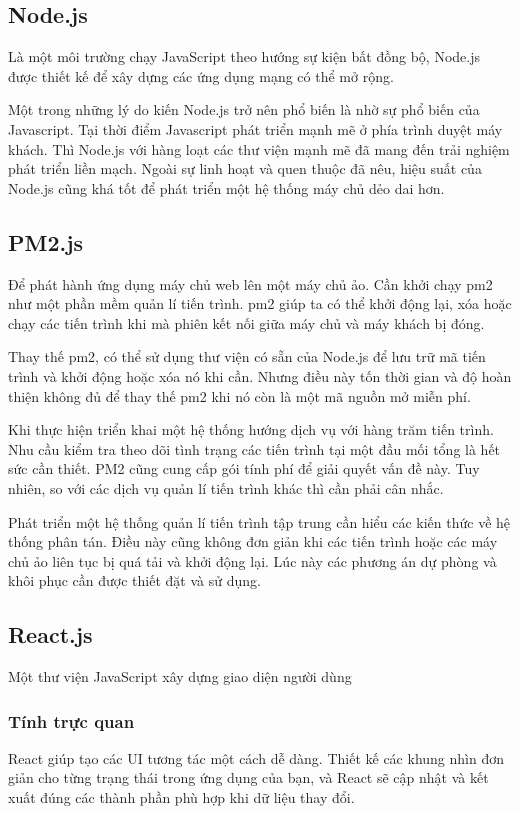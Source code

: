 {{\subsection{Node.js}
Là một môi trường chạy JavaScript theo hướng sự kiện bất đồng bộ, Node.js được thiết kế để xây dựng các ứng dụng mạng có thể mở rộng.

Một trong những lý do kiến Node.js trở nên phổ biến là nhờ sự phổ biến của Javascript. Tại thời điểm Javascript phát triển mạnh mẽ ở phía trình duyệt máy khách. Thì Node.js với hàng loạt các thư viện mạnh mẽ đã mang đến trải nghiệm phát triển liền mạch. Ngoài sự linh hoạt và quen thuộc đã nêu, hiệu suất của Node.js cũng khá tốt để phát triển một hệ thống máy chủ dẻo dai hơn.

\subsection{PM2.js}
Để phát hành ứng dụng máy chủ web lên một máy chủ ảo. Cần khởi chạy pm2 như một phần mềm quản lí tiến trình.
pm2 giúp ta có thể khởi động lại, xóa hoặc chạy các tiến trình khi mà phiên kết nối giữa máy chủ và máy khách bị đóng.

Thay thế pm2, có thể sử dụng thư viện có sẵn của Node.js để lưu trữ mã tiến trình và khởi động hoặc xóa nó khi cần. Nhưng điều này tốn thời gian và độ hoàn thiện không đủ để thay thế pm2 khi nó còn là một mã nguồn mở miễn phí.

Khi thực hiện triển khai một hệ thống hướng dịch vụ với hàng trăm tiến trình. Nhu cầu kiểm tra theo dõi tình trạng các tiến trình tại một đầu mối tổng là hết sức cần thiết. PM2 cũng cung cấp gói tính phí để giải quyết vấn đề này. Tuy nhiên, so với các dịch vụ quản lí tiến trình khác thì cần phải cân nhắc.

Phát triển một hệ thống quản lí tiến trình tập trung cần hiểu các kiến thức về hệ thống phân tán. Điều này cũng không đơn giản khi các tiến trình hoặc các máy chủ ảo liên tục bị quá tải và khởi động lại. Lúc này các phương án dự phòng và khôi phục cần được thiết đặt và sử dụng.

\subsection{React.js \cite{web:react}} 
Một thư viện JavaScript xây dựng giao diện người dùng

\subsubsection{Tính trực quan}
React giúp tạo các UI tương tác một cách dễ dàng. Thiết kế các khung nhìn đơn giản cho từng trạng thái trong ứng dụng của bạn, và React sẽ cập nhật và kết xuất đúng các thành phần phù hợp khi dữ liệu thay đổi.

}}
